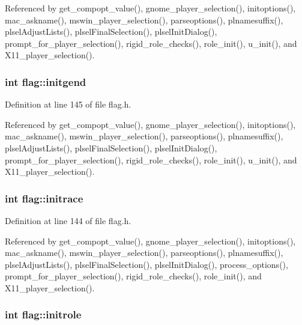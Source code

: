 Referenced by get\+\_\+compopt\+\_\+value(), gnome\+\_\+player\+\_\+selection(), initoptions(), mac\+\_\+askname(), mswin\+\_\+player\+\_\+selection(), parseoptions(), plnamesuffix(), plsel\+Adjust\+Lists(), plsel\+Final\+Selection(), plsel\+Init\+Dialog(), prompt\+\_\+for\+\_\+player\+\_\+selection(), rigid\+\_\+role\+\_\+checks(), role\+\_\+init(), u\+\_\+init(), and X11\+\_\+player\+\_\+selection().

\hypertarget{structflag_ad3655bdc9c8984f4d3c4944a7a72795a}{
\subsubsection[{initgend}]{\setlength{\rightskip}{0pt plus 5cm}int flag\+::initgend}}\label{structflag_ad3655bdc9c8984f4d3c4944a7a72795a}


Definition at line 145 of file flag.\+h.



Referenced by get\+\_\+compopt\+\_\+value(), gnome\+\_\+player\+\_\+selection(), initoptions(), mac\+\_\+askname(), mswin\+\_\+player\+\_\+selection(), parseoptions(), plnamesuffix(), plsel\+Adjust\+Lists(), plsel\+Final\+Selection(), plsel\+Init\+Dialog(), prompt\+\_\+for\+\_\+player\+\_\+selection(), rigid\+\_\+role\+\_\+checks(), role\+\_\+init(), u\+\_\+init(), and X11\+\_\+player\+\_\+selection().

\hypertarget{structflag_a4c946d68b3e8e39311a0d20be0027a26}{
\subsubsection[{initrace}]{\setlength{\rightskip}{0pt plus 5cm}int flag\+::initrace}}\label{structflag_a4c946d68b3e8e39311a0d20be0027a26}


Definition at line 144 of file flag.\+h.



Referenced by get\+\_\+compopt\+\_\+value(), gnome\+\_\+player\+\_\+selection(), initoptions(), mac\+\_\+askname(), mswin\+\_\+player\+\_\+selection(), parseoptions(), plnamesuffix(), plsel\+Adjust\+Lists(), plsel\+Final\+Selection(), plsel\+Init\+Dialog(), process\+\_\+options(), prompt\+\_\+for\+\_\+player\+\_\+selection(), rigid\+\_\+role\+\_\+checks(), role\+\_\+init(), and X11\+\_\+player\+\_\+selection().

\hypertarget{structflag_a3b31f41da5faa08ea53d1e7ddf857088}{
\subsubsection[{initrole}]{\setlength{\rightskip}{0pt plus 5cm}int flag\+::initrole}}\label{structflag_a3b31f41da5faa08ea53d1e7ddf857088}



